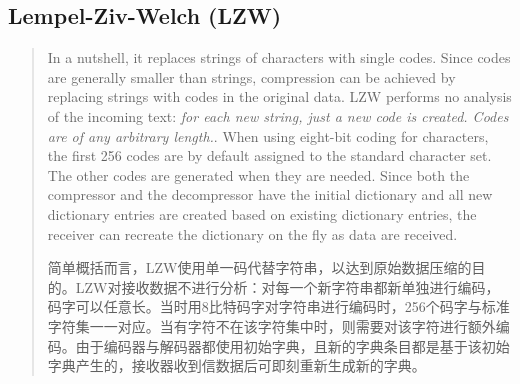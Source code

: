 \subsection{Lempel-Ziv-Welch (LZW)}
\begin{quote}
    In a nutshell, it replaces strings of characters with single codes. Since codes are generally smaller than strings, compression can be achieved by replacing strings with codes in the original data. LZW performs no analysis of the incoming text: \emph{\textcolor[rgb]{1,0,0}{for each new string, just a new code is created. Codes are of any arbitrary length.}}. When using eight-bit coding for characters, the first 256 codes are by default assigned to \textcolor[rgb]{1,0,0}{the standard character set}. The other codes are generated when they are needed. Since both the compressor and the decompressor have the initial dictionary and all new dictionary entries are created based on existing dictionary entries, the receiver can recreate the dictionary on the fly as data are received.

    简单概括而言，LZW使用单一码代替字符串，以达到原始数据压缩的目的。LZW对接收数据不进行分析：对每一个新字符串都新单独进行编码，码字可以任意长。当时用8比特码字对字符串进行编码时，256个码字与标准字符集一一对应。当有字符不在该字符集中时，则需要对该字符进行额外编码。由于编码器与解码器都使用初始字典，且新的字典条目都是基于该初始字典产生的，接收器收到信数据后可即刻重新生成新的字典。
\end{quote}

